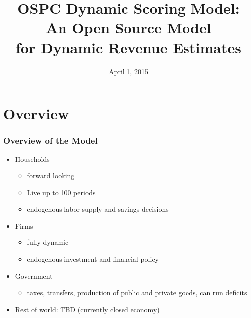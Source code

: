 \documentclass{beamer}
\title[OSPC Dynamic Scoring Model]
{OSPC Dynamic Scoring Model: \\
An Open Source Model \\ for Dynamic Revenue Estimates}
\date[Short Occasion] %
{April 1, 2015}
\begin{document}
\begin{frame}
  \titlepage
\end{frame}


\section{Overview}

  \begin{frame}
    \frametitle{Overview of the Model}
    \begin{itemize}
      \item Households
        \begin{itemize}
          \item forward looking
          \item Live up to 100 periods
          \item endogenous labor supply and savings decisions
        \end{itemize}
      \vspace{3mm}
      \item Firms
        \begin{itemize}
          \item fully dynamic
          \item endogenous investment and financial policy
        \end{itemize}
      \vspace{3mm}
      \item Government
        \begin{itemize}
          \item taxes, transfers, production of public and private goods, can run deficits
        \end{itemize}
      \vspace{3mm}
      \item Rest of world: TBD (currently closed economy)
    \end{itemize}
  \end{frame}
\end{document}
